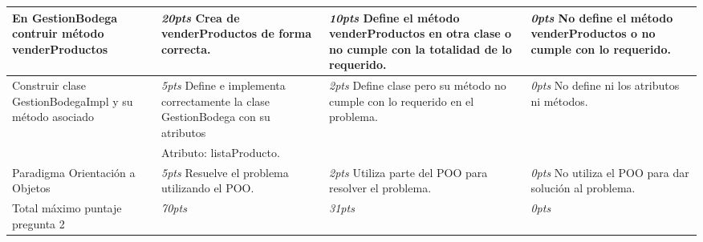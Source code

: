 \documentclass[10pt]{article}
\begin{document}
\begin{table}[!ht]
{\begin{center}
\begin{tabular}{|p{3.5cm}|p{3.5cm}|p{3.5cm}|p{3.5cm}|}
                En GestionBodega contruir m\'etodo {venderProductos}  &
                \emph{20pts} Crea de {venderProductos} de forma correcta. &
                \emph{  10pts} Define el m\'etodo {venderProductos} en otra clase o no cumple con la totalidad de lo requerido. &
                \emph{  0pts} No define el m\'etodo {venderProductos} o no cumple con lo requerido. \\ \hline

                Construir clase GestionBodegaImpl y su m\'etodo asociado &
                \emph{5pts} Define e implementa correctamente la clase GestionBodega con su atributos  &
                \emph{2pts} Define clase pero su m\'etodo no cumple con lo requerido en el problema. &
                \emph{  0pts} No define ni los atributos ni m\'etodos. \\
                & Atributo: listaProducto. & & \\ \hline

                Paradigma Orientaci\'on a Objetos  &
                \emph{5pts} Resuelve el problema utilizando el POO. &
                \emph{2pts} Utiliza parte del POO para resolver el problema. &
                \emph{0pts} No utiliza el POO para dar soluci\'on al problema.\\ \hline
                Total m\'aximo puntaje pregunta 2 &
                \emph{70pts} &
                \emph{31pts} &
                \emph{  0pts} \\ \hline
            \end{tabular}
        \end{center}}
     \end{table}
\end{document}
